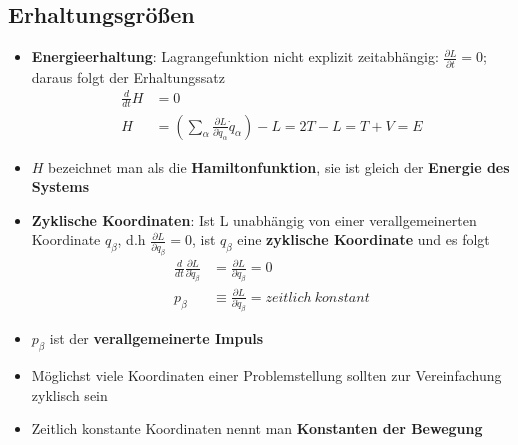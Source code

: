 \newpage
\subsection{Erhaltungsgrößen}%
\label{lag:sub:erhaltungsgroessen}

\begin{itemize}
	\item \textbf{Energieerhaltung}: Lagrangefunktion nicht explizit zeitabhängig: $\frac{\partial L}{\partial t} = 0$; daraus folgt der Erhaltungssatz
	\begin{align*}
		\frac{d}{dt}H &= 0\\
		H &= (\sum_\alpha\frac{\partial L}{\partial \dot{q}_\alpha}\dot{q}_\alpha) - L = 2T - L = T + V = E
	\end{align*}
	\item $H$ bezeichnet man als die \textbf{Hamiltonfunktion}, sie ist gleich der \textbf{Energie des Systems}
	\item \textbf{Zyklische Koordinaten}: Ist L unabhängig von einer verallgemeinerten Koordinate $q_\beta$, d.h $\frac{\partial L}{\partial q_\beta} = 0$, ist $q_\beta$ eine \textbf{zyklische Koordinate} und es folgt
	\begin{align*}
		\frac{d}{dt}\frac{\partial L}{\partial \dot{q}_\beta} &= \frac{\partial L}{\partial q_\beta} = 0\\
		p_\beta &\equiv \frac{\partial L}{\partial \dot{q}_\beta} = zeitlich\ konstant
	\end{align*}
	\item $p_\beta$ ist der \textbf{verallgemeinerte Impuls}
	\item Möglichst viele Koordinaten einer Problemstellung sollten zur Vereinfachung zyklisch sein
	\item Zeitlich konstante Koordinaten nennt man \textbf{Konstanten der Bewegung}
\end{itemize}